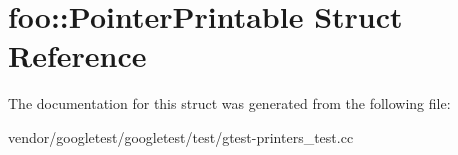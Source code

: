 \hypertarget{structfoo_1_1_pointer_printable}{}\section{foo\+:\+:Pointer\+Printable Struct Reference}
\label{structfoo_1_1_pointer_printable}


The documentation for this struct was generated from the following file\+:\begin{DoxyCompactItemize}
\item 
vendor/googletest/googletest/test/gtest-\/printers\+\_\+test.\+cc\end{DoxyCompactItemize}
